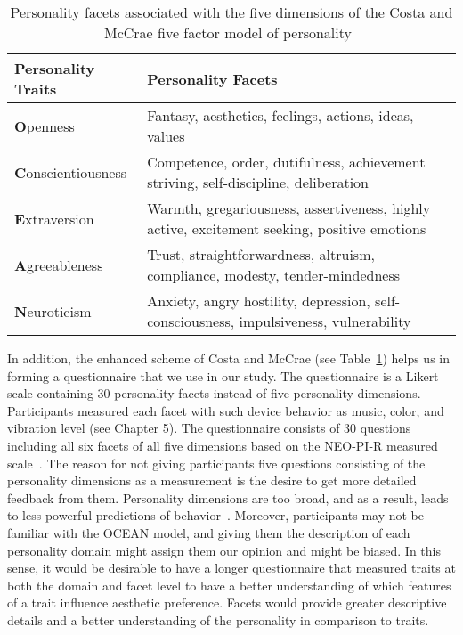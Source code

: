 \begin{table} [h]
    \centering
    \begin{tabular}{ | m{8em} | m{25em}| }
        \hline
        \textbf{Personality Traits} & \textbf{Personality Facets}  \\
        \hline
        \textbf{O}penness & Fantasy, aesthetics, feelings, actions, ideas, values  \\
        \hline
        \textbf{C}onscientiousness & Competence, order, dutifulness, achievement striving, self-discipline, deliberation  \\
        \hline
        \textbf{E}xtraversion & Warmth, gregariousness, assertiveness, highly active, excitement seeking, positive emotions \\
        \hline
        \textbf{A}greeableness & Trust, straightforwardness, altruism, compliance, modesty, tender-mindedness  \\
        \hline
        \textbf{N}euroticism & Anxiety, angry hostility, depression, self-consciousness, impulsiveness, vulnerability \\
        \hline
    \end{tabular}
    \caption{Personality facets associated with the five dimensions of the Costa and McCrae five factor model of personality~\cite{costa2008revised, matthews2003personality}}
    \label{table:personality}
\end{table}

In addition, the enhanced scheme of Costa and McCrae (see Table~\ref{table:personality})
helps us in forming a questionnaire that we use in our study.
The questionnaire is a Likert scale containing 30 personality facets instead of five personality dimensions.
Participants measured each facet with such device behavior as music, color, and vibration level (see Chapter 5).
The questionnaire consists of 30 questions including all six facets of
all five dimensions based on the NEO-PI-R measured scale~\cite{costa2008revised}.
The reason for not giving participants five questions consisting of the personality
dimensions as a measurement is the desire to get more detailed feedback from them.
Personality dimensions are too broad, and as a result, leads to less powerful predictions of behavior~\cite{paunonen2001big}.
Moreover, participants may not be familiar with the OCEAN model, and giving them the description
of each personality domain might assign them our opinion and might be biased.
In this sense, it would be desirable to have a longer questionnaire that measured traits at both the
domain and facet level to have a better understanding of which features of a trait influence aesthetic preference.
Facets would provide greater descriptive details and a better understanding of the personality in comparison to traits.

